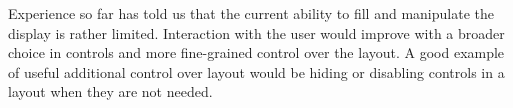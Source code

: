 \documentclass{article}
\begin{document}
   Experience so far has told us that the current ability to fill and
   manipulate the display is rather limited. Interaction with the user would
   improve with a broader choice in controls and more fine-grained control over
   the layout. A good example of useful additional control over layout would be
   hiding or disabling controls in a layout when they are not needed.



  \enlargethispage*{4pt}
  
\end{document}
